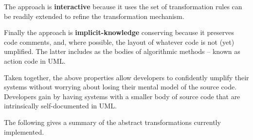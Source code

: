 The approach is \textbf{interactive} because it uses the set of transformation rules can be readily extended to refine the transformation mechanism. 

Finally the approach is \textbf{implicit-knowledge} conserving because it preserves code comments, and, where possible, the layout of whatever code is not (yet) umplified. The latter includes as the bodies of algorithmic methods – known as action code in UML.

Taken together, the above properties allow developers to confidently umplify their systems without worrying about losing their mental model of the source code. Developers gain by having systems with a smaller body of source code that are intrinsically self-documented in UML. 

The following gives a summary of the abstract transformations currently implemented.
